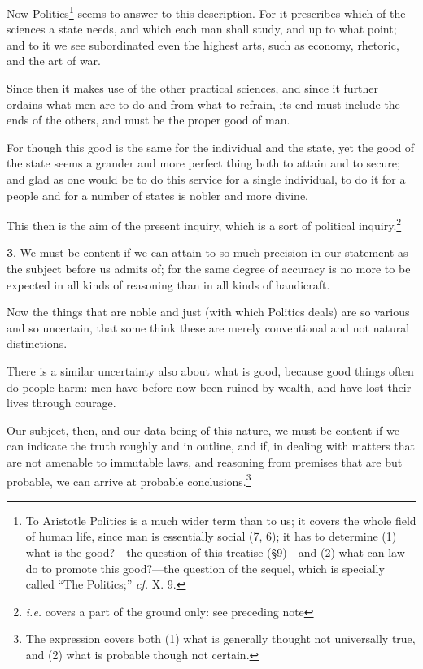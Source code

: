 Now Politics\footnote{To Aristotle Politics is a much wider term than
to us; it covers the whole field of human life, since man is
essentially social (7, 6); it has to determine (1) what is the
good?---the question of this treatise (\S9)---and (2) what can law do
to promote this good?---the question of the sequel, which is specially
called ``The Politics;'' \textit{cf.} X. 9.} seems to answer to this
description.  For it prescribes which of the sciences a state
needs, and which each man shall study, and up to what point; and to it
we see subordinated even the highest arts, such as economy, rhetoric,
and the art of war.

Since then it makes use of the other practical sciences, and since it
further ordains what men are to do and from what to refrain, its end
must include the ends of the others, and must be the proper good of
man.

For though this good is the same for the individual and the state, yet
the good of the state seems a grander and more perfect thing both to
attain and to secure; and glad as one would be to do this service for
a single individual, to do it for a people and for a number of states
is nobler and more divine.

This then is the aim of the present inquiry, which is a sort of
political inquiry.\footnote{\textit{i.e.} covers a part of the ground
only: see preceding note}

\textbf{3}. We must be content if we can attain to so much precision
in our statement as the subject before us admits of; for the same
degree of accuracy is no more to be expected in all kinds of reasoning
than in all kinds of handicraft.

Now the things that are noble and just (with which Politics deals) are
so various and so uncertain, that some think these are merely
conventional and not natural distinctions.

There is a similar uncertainty also about what is good, because good
things often do people harm: men have before now been ruined by
wealth, and have lost their lives through courage.

Our subject, then, and our data being of this  nature, we must
be content if we can indicate the truth roughly and in outline, and
if, in dealing with matters that are not amenable to immutable laws,
and reasoning from premises that are but probable, we can arrive at
probable conclusions.\footnote{The expression 
covers both (1) what is generally thought not universally true, and
(2) what is probable though not certain.}

